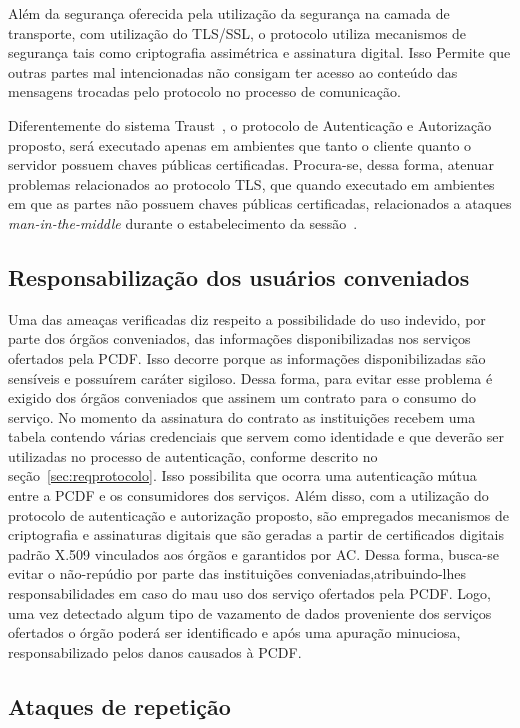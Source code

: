 Além da segurança oferecida pela utilização da segurança na camada de transporte, com utilização do TLS/SSL, o protocolo utiliza mecanismos de segurança tais como criptografia assimétrica e assinatura digital. Isso Permite que outras partes mal intencionadas não consigam ter acesso ao conteúdo das mensagens trocadas pelo protocolo no processo de comunicação.

Diferentemente do sistema Traust~\cite{traust08}, o protocolo de Autenticação e Autorização proposto, será executado apenas em ambientes que tanto o cliente quanto o servidor possuem chaves públicas certificadas. Procura-se, dessa forma, atenuar problemas relacionados ao protocolo TLS, que quando executado em ambientes em que as partes
n\~{a}o possuem chaves públicas certificadas, relacionados a ataques \emph{man-in-the-middle} durante o estabelecimento da sessão~\cite{traust08}.

\subsection{Responsabilização dos usuários conveniados}

Uma das ameaças verificadas diz respeito a possibilidade do uso indevido, por parte dos órgãos conveniados, das informações disponibilizadas nos serviços ofertados pela PCDF. Isso decorre porque as informações disponibilizadas s\~{a}o sensíveis e possuírem caráter sigiloso. Dessa forma, para evitar esse problema é exigido dos órgãos conveniados que assinem um contrato para o consumo do serviço. No momento da assinatura do contrato as institui\c c\~{o}es recebem uma tabela contendo várias credenciais que servem como identidade e que deverão ser utilizadas no processo de autenticação, conforme descrito no seção~\ref{sec:reqprotocolo}. Isso possibilita que ocorra uma autenticação mútua entre a PCDF e os consumidores dos serviços. Além disso, com a utilização do protocolo de autenticação e autorização proposto, são empregados mecanismos de criptografia e assinaturas digitais que são geradas a partir de certificados digitais padrão X.509 vinculados aos órgãos e garantidos por AC. Dessa forma, busca-se evitar o não-repúdio por parte das instituições conveniadas,atribuindo-lhes responsabilidades em caso do mau uso dos serviço ofertados pela PCDF. Logo, uma vez detectado algum tipo de vazamento de dados proveniente dos serviços ofertados o órgão poderá ser identificado e após uma apuração minuciosa, responsabilizado pelos danos causados à PCDF.

\subsection{Ataques de repetição}

